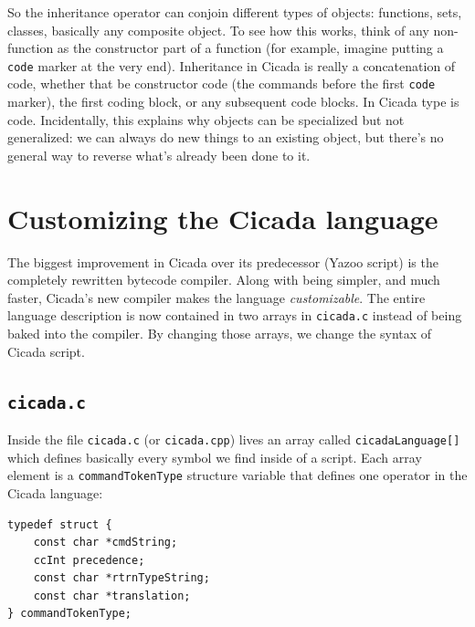 \documentclass{article}
\newenvironment{code}{
       \begin{list}{}{
               \setlength{\leftmargin}{.4in}
               \setlength{\rightmargin}{0in}
               \setlength{\topsep}{.2in}
       }
       \small
       \item[] }
       { \end{list}   }
\begin{document}
\noindent So the inheritance operator can conjoin different types of objects:  functions, sets, classes, basically any composite object.  To see how this works, think of any non-function as the constructor part of a function (for example, imagine putting a \verb#code# marker at the very end).  Inheritance in Cicada is really a concatenation of code, whether that be constructor code (the commands before the first \verb#code# marker), the first coding block, or any subsequent code blocks.  In Cicada type is code.  Incidentally, this explains why objects can be specialized but not generalized:  we can always do new things to an existing object, but there's no general way to reverse what's already been done to it.



\newpage








\section{Customizing the Cicada language}

The biggest improvement in Cicada over its predecessor (Yazoo script) is the completely rewritten bytecode compiler.  Along with being simpler, and much faster, Cicada's new compiler makes the language \emph{customizable}.  The entire language description is now contained in two arrays in \verb#cicada.c# instead of being baked into the compiler.  By changing those arrays, we change the syntax of Cicada script.



\subsection{\texttt{cicada.c}}

Inside the file \verb#cicada.c# (or \verb#cicada.cpp#) lives an array called \verb#cicadaLanguage[]# which defines basically every symbol we find inside of a script.  Each array element is a \verb#commandTokenType# structure variable that defines one operator in the Cicada language:

\begin{code} \begin{verbatim}
typedef struct {
    const char *cmdString;
    ccInt precedence;
    const char *rtrnTypeString;
    const char *translation;
} commandTokenType;
\end{verbatim} \end{code}
\end{document}
